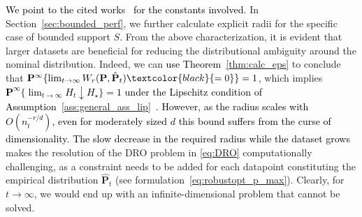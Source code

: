 \documentclass[12pt]{article}
\newcommand{\prob}{{\mathbf P}}
\newcommand{\Expect}{{\mbox{\bf E}}}
\newcommand{\supp}{S}
\newcommand{\epsnom}{\varepsilon}
\newtheorem{theorem}{Theorem}[section]  %
\newcommand{\RC}[1]{\textcolor{black}{#1}}
\newcommand{\RC}[1]{\textcolor{blue}{#1}}
\begin{document}
\RC{We point to the cited works~\cite{fournier2015rate,wass-p-guarantee,kuhn2019wasserstein} for the constants involved.}
\ifpreprint
In Section~\ref{sec:bounded_perf}, we further calculate explicit radii for the specific case of bounded support $\supp$. 
\fi
From the above characterization, it is evident that larger datasets are beneficial for reducing the distributional ambiguity around the nominal distribution. 
Indeed, we can \RC{use Theorem~\ref{thm:calc_eps}} to conclude that $\mathbf{P}^\infty \{ \lim_{t \rightarrow \infty} W_r(\mathbf{P}, \hat{\mathbf{P}}_t)\RC{ =0} \} = 1$, which implies \RC{$\mathbf{P}^\infty \{\lim_{t \rightarrow \infty}H_t \downarrow H_\star\}=1$ under the Lipschitz condition of Assumption~\ref{ass:general_ass_lip}~\cite[Theorem 3.7]{mohajerin2018data}.} \RC{However, as the radius scales with $O(n_t^{-r/d})$, even for moderately sized $d$ this bound suffers from the curse of dimensionality.}
\RC{The slow decrease in the required radius while the dataset grows} makes the resolution of the \gls{DRO} problem in \eqref{eq:DRO} computationally challenging, as a constraint needs to be added for each datapoint constituting the empirical distribution  $\hat{\mathbf{P}}_t$ (see formulation~\eqref{eq:robustopt_p_max}). 
Clearly, for $t \rightarrow \infty$, we would end up with an infinite-dimensional problem that cannot be solved. 
\end{document}
